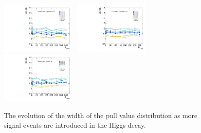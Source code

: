 \begin{figure}[!ht]
  \includegraphics[width=0.33\textwidth]{Fig/BiasStudy/Linearity/HJpsiG/pull_width_linearity_TrueFunc6}~
  \includegraphics[width=0.33\textwidth]{Fig/BiasStudy/Linearity/HJpsiG/pull_width_linearity_TrueFunc7}~
  \includegraphics[width=0.33\textwidth]{Fig/BiasStudy/Linearity/HJpsiG/pull_width_linearity_TrueFunc8}\\
  \caption{The evolution of the width of the pull value distribution as more signal events are introduced in the Higgs decay.}
  \label{fig:Linearity_width_HJpsiG}
\end{figure}
\clearpage
%
